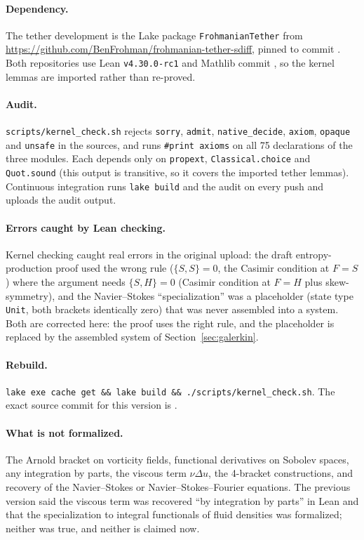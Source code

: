 \documentclass[11pt,a4paper]{article}
\begin{document}
\paragraph{Dependency.} The tether development is the Lake package \texttt{FrohmanianTether} from
\url{https://github.com/BenFrohman/frohmanian-tether-sdiff}, pinned to commit
\texttt{}. Both repositories use Lean
\texttt{v4.30.0-rc1} and Mathlib commit \texttt{}, so the kernel
lemmas are imported rather than re-proved.

\paragraph{Audit.} \texttt{scripts/kernel\_check.sh} rejects \texttt{sorry}, \texttt{admit},
\texttt{native\_decide}, \texttt{axiom}, \texttt{opaque} and \texttt{unsafe} in the sources, and runs
\texttt{\#print axioms} on all 75 declarations of the three modules. Each depends only on
\texttt{propext}, \texttt{Classical.choice} and \texttt{Quot.sound} (this output is transitive, so it covers
the imported tether lemmas). Continuous integration runs \texttt{lake build} and the audit on every push
and uploads the audit output.

\paragraph{Errors caught by Lean checking.} Kernel checking caught real errors in the original
upload: the draft entropy-production proof used the wrong rule (\(\{S,S\}=0\), the Casimir condition at
\(F=S\)) where the argument needs \(\{S,H\}=0\) (Casimir condition at \(F=H\) plus skew-symmetry), and the
Navier--Stokes ``specialization'' was a placeholder (state type \texttt{Unit}, both brackets identically
zero) that was never assembled into a system. Both are corrected here: the proof uses the right rule,
and the placeholder is replaced by the assembled system of Section~\ref{sec:galerkin}.

\paragraph{Rebuild.} \texttt{lake exe cache get \&\& lake build \&\& ./scripts/kernel\_check.sh}.
The exact source commit for this version is \texttt{}.

\paragraph{What is not formalized.} The Arnold bracket on vorticity fields, functional derivatives on
Sobolev spaces, any integration by parts, the viscous term \(\nu\Delta u\), the 4-bracket constructions, and
recovery of the Navier--Stokes or Navier--Stokes--Fourier equations. The previous version said the viscous
term was recovered ``by integration by parts'' in Lean and that the specialization to integral
functionals of fluid densities was formalized; neither was true, and neither is claimed now.
\end{document}
